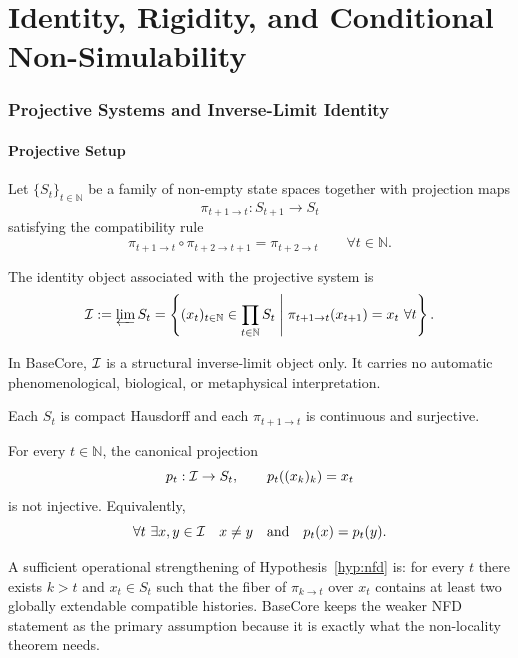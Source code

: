 \part{Identity, Rigidity, and Conditional Non-Simulability}
\section{Projective Systems and Inverse-Limit Identity}

\subsection{Projective Setup}

\begin{definition}
Let $\{S_t\}_{t\in\mathbb{N}}$ be a family of non-empty state spaces together with projection maps
\[
\pi_{t+1\to t}:S_{t+1}\to S_t
\]
satisfying the compatibility rule
\[
\pi_{t+1\to t}\circ \pi_{t+2\to t+1}=\pi_{t+2\to t}
\qquad
\forall t\in\mathbb{N}.
\]
\end{definition}

\begin{definition}
The identity object associated with the projective system is
\[
\mathcal{I}:=\varprojlim S_t
=
\left\{
(x_t)_{t\in\mathbb{N}}\in \prod_{t\in\mathbb{N}} S_t
\;\middle|\;
\pi_{t+1\to t}(x_{t+1})=x_t\ \forall t
\right\}.
\]
\end{definition}

\begin{remark}
In BaseCore, $\mathcal{I}$ is a structural inverse-limit object only. It carries no automatic phenomenological, biological, or metaphysical interpretation.
\end{remark}

\begin{hypothesis}\label{hyp:topo}
Each $S_t$ is compact Hausdorff and each $\pi_{t+1\to t}$ is continuous and surjective.
\end{hypothesis}

\begin{hypothesis}\label{hyp:nfd}
For every $t\in\mathbb{N}$, the canonical projection
\[
p_t:\mathcal{I}\to S_t,
\qquad
p_t((x_k)_k)=x_t
\]
is not injective. Equivalently,
\[
\forall t\ \exists x,y\in\mathcal{I}
\quad
x\neq y
\quad\text{and}\quad
p_t(x)=p_t(y).
\]
\end{hypothesis}

\begin{remark}
A sufficient operational strengthening of Hypothesis~\ref{hyp:nfd} is: for every $t$ there exists $k>t$ and $x_t\in S_t$ such that the fiber of $\pi_{k\to t}$ over $x_t$ contains at least two globally extendable compatible histories. BaseCore keeps the weaker NFD statement as the primary assumption because it is exactly what the non-locality theorem needs.
\end{remark}

